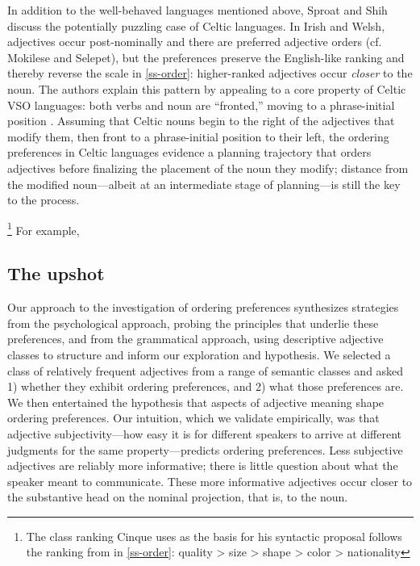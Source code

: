\documentclass{pnastwo}
\begin{document}
\begin{article}
In addition to the well-behaved languages mentioned above, Sproat and Shih discuss the potentially puzzling case of Celtic languages. In Irish and Welsh, adjectives occur post-nominally and there are preferred adjective orders (cf. Mokilese and Selepet), but the preferences preserve the English-like ranking and thereby reverse the scale in \ref{ss-order}: higher-ranked adjectives occur  \emph{closer} to the noun. The authors explain this pattern by appealing to a core property of Celtic VSO languages: both verbs and noun are ``fronted,'' moving to a phrase-initial position \cite{sproat1985,guilfoyle1987}. Assuming that Celtic nouns begin to the right of the adjectives that modify them, then front to a phrase-initial position to their left, the ordering preferences in Celtic languages evidence a planning trajectory that orders adjectives before finalizing the placement of the noun they modify; distance from the modified noun---albeit at an intermediate stage of planning---is still the key to the process.

\footnote{The class ranking Cinque uses as the basis for his syntactic proposal follows the ranking from \cite{sproatshih1991} in \ref{ss-order}: 
	\be quality > size > shape > color > nationality\label{cinque-order}\ee}
For example, 



\subsection{The upshot} Our approach to the investigation of ordering preferences synthesizes strategies from the psychological approach, probing the principles that underlie these preferences, and from the grammatical approach, using descriptive adjective classes to structure and inform our exploration and hypothesis. We selected a class of relatively frequent adjectives from a range of semantic classes and asked 1) whether they exhibit ordering preferences, and 2) what those preferences are. We then entertained the hypothesis that aspects of adjective meaning shape ordering preferences. Our intuition, which we validate empirically, was that adjective subjectivity---how easy it is for different speakers to arrive at different judgments for the same property---predicts ordering preferences. Less subjective adjectives are reliably more informative; there is little question about what the speaker meant to communicate. These more informative adjectives occur closer to the substantive head on the nominal projection, that is, to the noun.


\end{article}
\end{document}
